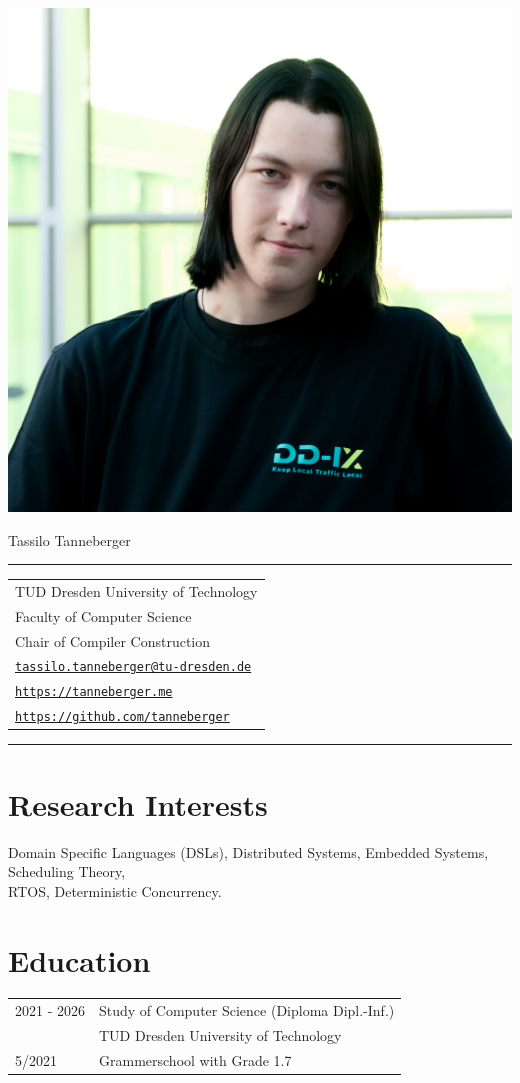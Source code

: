 \documentclass[11pt, a4paper, oneside]{article}
\begin{document}
\includegraphics[width=0.3\linewidth, right]{Tassilo} 
\vspace*{-16em}
\begin{flushleft}
\hspace*{1.3em} \huge Tassilo Tanneberger
\vspace*{-0.5em}
\par\noindent\rule{0.6\textwidth}{0.4pt}
\end{flushleft}

\vspace*{-0.4em}

\begin{tabular}{l}
TUD Dresden University of Technology  \\
Faculty of Computer Science \\ 
Chair of Compiler Construction \\ 
\href{mailto: tassilo.tanneberger@tu-dresden.de}{\texttt{tassilo.tanneberger@tu-dresden.de}} \\
\href{https://tanneberger.me}{\texttt{https://tanneberger.me}} \\
\href{https://github.com/tanneberger}{\texttt{https://github.com/tanneberger}}
\end{tabular}

\par\noindent\rule{0.6\textwidth}{0.4pt}

\section*{Research Interests}

Domain Specific Languages (DSLs), Distributed Systems, Embedded Systems, Scheduling Theory, \\ RTOS,  Deterministic Concurrency.  

\section*{Education}

\begin{tabular}{ R{3cm} L{10cm}}
	2021 - 2026       & Study of Computer Science (Diploma Dipl.-Inf.) \\
							      & TUD Dresden University of Technology \\ 
	5/2021			      & Grammerschool with Grade 1.7
\end{tabular}
\end{document}
